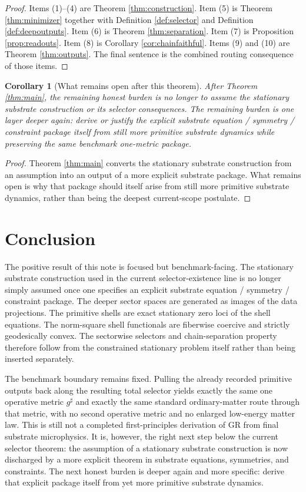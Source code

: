 \documentclass[11pt]{article}
\newcommand{\CompletedMetric}{g^{\sharp}}
\newtheorem{corollary}{Corollary}
\begin{document}
\begin{proof}
Items (1)--(4) are Theorem \ref{thm:construction}. Item (5) is Theorem \ref{thm:minimizer} together with Definition \ref{def:selector} and Definition \ref{def:deepoutputs}. Item (6) is Theorem \ref{thm:separation}. Item (7) is Proposition \ref{prop:readouts}. Item (8) is Corollary \ref{cor:chainfaithful}. Items (9) and (10) are Theorem \ref{thm:outputs}. The final sentence is the combined routing consequence of those items.
\end{proof}

\begin{corollary}[What remains open after this theorem]
\label{cor:next}
After Theorem \ref{thm:main}, the remaining honest burden is no longer to assume the stationary substrate construction or its selector consequences. The remaining burden is one layer deeper again: derive or justify the explicit substrate equation / symmetry / constraint package itself from still more primitive substrate dynamics while preserving the same benchmark one-metric package.
\end{corollary}

\begin{proof}
Theorem \ref{thm:main} converts the stationary substrate construction from an assumption into an output of a more explicit substrate package. What remains open is why that package should itself arise from still more primitive substrate dynamics, rather than being the deepest current-scope postulate.
\end{proof}

\section{Conclusion}

The positive result of this note is focused but benchmark-facing. The stationary substrate construction used in the current selector-existence line is no longer simply assumed once one specifies an explicit substrate equation / symmetry / constraint package. The deeper sector spaces are generated as images of the data projections. The primitive shells are exact stationary zero loci of the shell equations. The norm-square shell functionals are fiberwise coercive and strictly geodesically convex. The sectorwise selectors and chain-separation property therefore follow from the constrained stationary problem itself rather than being inserted separately.

The benchmark boundary remains fixed. Pulling the already recorded primitive outputs back along the resulting total selector yields exactly the same one operative metric \(\CompletedMetric\) and exactly the same standard ordinary-matter route through that metric, with no second operative metric and no enlarged low-energy matter law. This is still not a completed first-principles derivation of GR from final substrate microphysics. It is, however, the right next step below the current selector theorem: the assumption of a stationary substrate construction is now discharged by a more explicit theorem in substrate equations, symmetries, and constraints. The next honest burden is deeper again and more specific: derive that explicit package itself from yet more primitive substrate dynamics.
\end{document}
